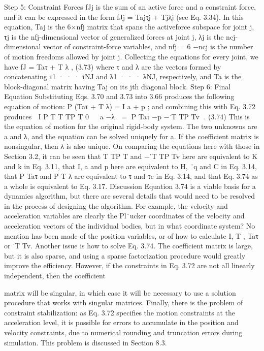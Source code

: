 Step 5: Constraint Forces fJj is the sum of an active force and a constraint force, and it can be expressed in the form fJj = Tajτj + Tjλj (see Eq. 3.34). In this equation, Taj is the 6×nfj matrix that spans the activeforce subspace for joint j, τj is the nfj-dimensional vector of generalized forces at joint j, λj is the ncj-dimensional vector of constraint-force variables, and nfj = 6 −ncj is the number of motion freedoms allowed by joint j. Collecting the equations for every joint, we have fJ = Taτ + T λ , (3.73) where τ and λ are the vectors formed by concatenating τ1 · · · τNJ and λ1 · · · λNJ, respectively, and Ta is the block-diagonal matrix having Taj on its jth diagonal block. Step 6: Final Equation Substituting Eqs. 3.70 and 3.73 into 3.66 produces the following equation of motion: P (Taτ + T λ) = I a + p ; and combining this with Eq. 3.72 produces  I P T T TP T 0   a −λ  = P Taτ −p −˙T TP Tv  . (3.74) This is the equation of motion for the original rigid-body system. The two unknowns are a and λ, and the equation can be solved uniquely for a. If the coefficient matrix is nonsingular, then λ is also unique. On comparing the equations here with those in Section 3.2, it can be seen that T TP T and −˙T TP Tv here are equivalent to K and k in Eq. 3.11, that I, a and p here are equivalent to H, ¨q and C in Eq. 3.14, that P Taτ and P T λ are equivalent to τ and τc in Eq. 3.14, and that Eq. 3.74 as a whole is equivalent to Eq. 3.17. Discussion Equation 3.74 is a viable basis for a dynamics algorithm, but there are several details that would need to be resolved in the process of designing the algorithm. For example, the velocity and acceleration variables are clearly the Pl¨ucker coordinates of the velocity and acceleration vectors of the individual bodies, but in what coordinate system? No mention has been made of the position variables, or of how to calculate I, T , Taτ or ˙T Tv. Another issue is how to solve Eq. 3.74. The coefficient matrix is large, but it is also sparse, and using a sparse factorization procedure would greatly improve the efficiency. However, if the constraints in Eq. 3.72 are not all linearly independent, then the coefficient

matrix will be singular, in which case it will be necessary to use a solution procedure that works with singular matrices. Finally, there is the problem of constraint stabilization: as Eq. 3.72 specifies the motion constraints at the acceleration level, it is possible for errors to accumulate in the position and velocity constraints, due to numerical rounding and truncation errors during simulation. This problem is discussed in Section 8.3.
